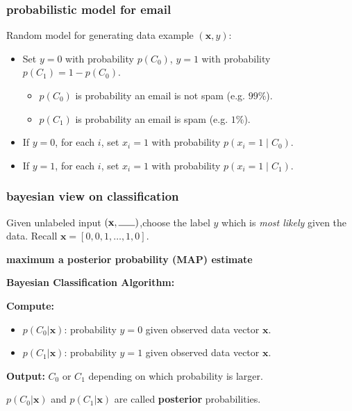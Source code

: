 \documentclass[handout,compress]{beamer}
\newcommand{\bv}[1]{\mathbf{#1}}
\begin{document}
\begin{frame}
	\frametitle{probabilistic model for email}
	Random model for generating data example $(\bv{x},y)$:
	\begin{itemize}
		\item Set $y = 0$ with probability $p(C_0)$, $y = 1$ with probability $p(C_1) = 1-p(C_0)$. 
		\begin{itemize}
			\item $p(C_0)$ is probability an email is not spam (e.g. $99\%$). 
			\item $p(C_1)$ is probability an email is spam (e.g. $1\%$). 
		\end{itemize}
		\item If $y=0$, for each $i$, set $x_i = 1$ with probability $p(x_i = 1 \mid C_0)$.
		\item If $y=1$, for each $i$, set $x_i = 1$ with probability $p(x_i = 1\mid C_1)$.
	\end{itemize}
\end{frame}

\begin{frame}
	\frametitle{bayesian view on classification}
	Given unlabeled input $(\bv{x},\rule{.6cm}{0.15mm})$,choose the label $y$ which is \emph{most likely} given the data. Recall $\bv{x} = [0,0,1,\ldots, 1, 0]$. 
	
	\begin{center}
		\textbf{maximum a posterior probability (MAP) estimate}
		
		\vspace{1em}
		\alert{\textbf{Bayesian Classification Algorithm:} }
		\vspace{-.5em}
	\end{center}
	\textbf{Compute:}
	\begin{itemize}
		\item $p(C_0 | \bv{x})$: probability $y = 0$ given observed data vector $\bv{x}$. 
		\item $p(C_1 | \bv{x})$: probability $y = 1$ given observed data vector $\bv{x}$. 
	\end{itemize}
	\textbf{Output:} $C_0$ or $C_1$ depending on which probability is larger.
	
	\begin{center}
		$p(C_0 | \bv{x})$ and $p(C_1 | \bv{x})$ are called \textbf{\alert{posterior}} probabilities.
	\end{center}
\end{frame}
\end{document}
